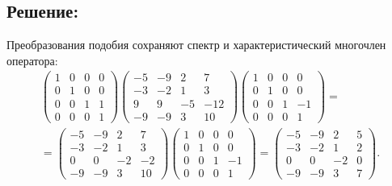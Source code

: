 \documentclass[12pt]{article}
\begin{document}
    \subsection*{Решение:}
    Преобразования подобия сохраняют спектр и характеристический многочлен оператора:
    \begin{multline*}
        \begin{pmatrix}
            1 & 0 & 0 & 0 \\
            0 & 1 & 0 & 0 \\
            0 & 0 & 1 & 1 \\
            0 & 0 & 0 & 1
        \end{pmatrix}
        \begin{pmatrix}
            -5 & -9 & 2  & 7   \\
            -3 & -2 & 1  & 3   \\
            9  & 9  & -5 & -12 \\
            -9 & -9 & 3  & 10
        \end{pmatrix}
        \begin{pmatrix}
            1 & 0 & 0 & 0  \\
            0 & 1 & 0 & 0  \\
            0 & 0 & 1 & -1 \\
            0 & 0 & 0 & 1
        \end{pmatrix} = \\
        =
        \begin{pmatrix}
            -5 & -9 & 2  & 7  \\
            -3 & -2 & 1  & 3  \\
            0  & 0  & -2 & -2 \\
            -9 & -9 & 3  & 10
        \end{pmatrix}
        \begin{pmatrix}
            1 & 0 & 0 & 0  \\
            0 & 1 & 0 & 0  \\
            0 & 0 & 1 & -1 \\
            0 & 0 & 0 & 1
        \end{pmatrix}
        =
        \begin{pmatrix}
            -5 & -9 & 2  & 5 \\
            -3 & -2 & 1  & 2 \\
            0  & 0  & -2 & 0 \\
            -9 & -9 & 3  & 7
        \end{pmatrix}.
    \end{multline*}
\end{document}
